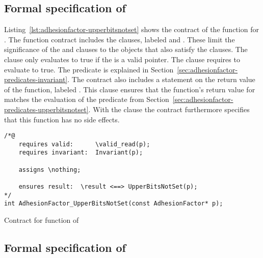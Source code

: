 \FloatBarrier

\subsection{Formal specification of }
\label{sec:adhesionfactor-upperbitsnotset}

Listing~\ref{lst:adhesionfactor-upperbitsnotset} shows the contract of the 
function for .
The function contract includes the  clauses, labeled  and .
These limit the significance of the  and  clauses to
the  objects that also satisfy the  clauses.
The  clause only evaluates to true if the  is a valid pointer.
The  clause requires  to evaluate to true.
The  predicate is explained
in Section~\ref{sec:adhesionfactor-predicates-invariant}.
The contract also includes a statement on the return value of the function, labeled .
This clause ensures that the function's return value for 
matches the evaluation of the predicate 
from Section~\ref{sec:adhesionfactor-predicates-upperbitsnotset}.
With the  clause the contract furthermore
specifies that this function has no side effects.

\begin{listing}[hbt]
\begin{minipage}{0.99\textwidth}
\begin{lstlisting}[style=acsl-block]
/*@
    requires valid:      \valid_read(p);
    requires invariant:  Invariant(p);

    assigns \nothing;

    ensures result:  \result <==> UpperBitsNotSet(p);
*/
int AdhesionFactor_UpperBitsNotSet(const AdhesionFactor* p);
\end{lstlisting}
\end{minipage}
\caption{\label{lst:adhesionfactor-upperbitsnotset}Contract for  function of }
\end{listing}

\FloatBarrier


\subsection{Formal specification of }
\label{sec:adhesionfactor-decodebit}

